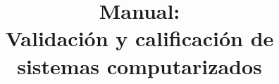 \documentclass[12pt,letterpaper]{report}
\begin{document}
\renewcommand{\listtablename}{Índice de tablas}
\renewcommand{\tablename}{Tabla}
    \title{\textbf{Manual:\\ Validación y calificación de sistemas computarizados}}
    \author{\textbf{}}


\beforepreface



\newpage
\afterpreface



 





%
%
%
\end{document}
